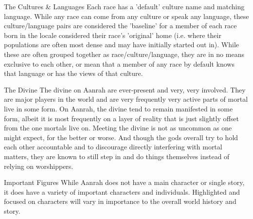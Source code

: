 The Cultures \& Languages
Each race has a 'default' culture name and matching language. While any race can come from any culture or speak any language, these culture/language pairs are considered the 'baseline' for a member of each race born in the locale considered their race's 'original' home (i.e. where their populations are often most dense and may have initially started out in). While these are often grouped together as race/culture/language, they are in no means exclusive to each other, or mean that a member of any race by default knows that language or has the views of that culture.

The Divine
The divine on Aanrah are ever-present and very, very involved. They are major players in the world and are very frequently very active parts of mortal live in some form. On Aanrah, the divine tend to remain manifested in some form, albeit it is most frequently on a layer of reality that is just slightly offset from the one mortals live on. Meeting the divine is not as uncommon as one might expect, for the better or worse. And though the gods overall try to hold each other accountable and to discourage directly interfering with mortal matters, they are known to still step in and do things themselves instead of relying on worshippers.

Important Figures
While Aanrah does not have a main character or single story, it does have a variety of important characters and individuals. Highlighted and focused on characters will vary in importance to the overall world history and story.